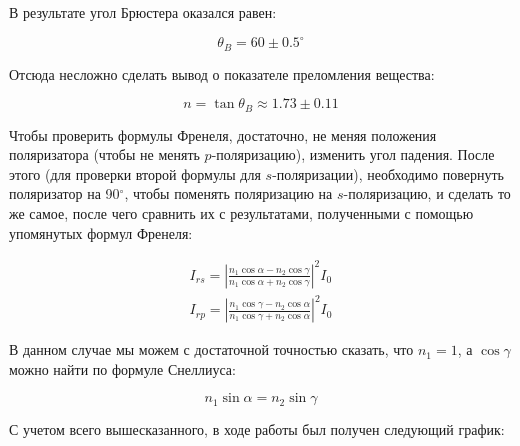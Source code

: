 \documentclass[a4paper, 12pt]{article}
\begin{document}
В результате угол Брюстера оказался равен:

\begin{equation*}
		\theta_{B} = 60 \pm 0.5 ^\circ 
\end{equation*}

Отсюда несложно сделать вывод о показателе преломления вещества:

\begin{equation*}
		n = \tan\theta_B \approx 1.73 \pm 0.11
\end{equation*}

Чтобы проверить формулы Френеля, достаточно, не меняя положения поляризатора (чтобы не менять $p$-поляризацию), изменить угол падения. После этого (для проверки второй формулы для $s$-поляризации), необходимо повернуть поляризатор на 90$^\circ$, чтобы поменять поляризацию на $s$-поляризацию, и сделать то же самое, после чего сравнить их с результатами, полученными с помощью упомянутых формул Френеля:

\begin{align}
	I_{rs} = \left|\frac{n_1\cos\alpha - n_2\cos\gamma}{n_1\cos\alpha + n_2 \cos\gamma}\right|^2 I_0\\
	I_{rp} = \left|\frac{n_1\cos\gamma - n_2\cos\alpha}{n_1\cos\gamma + n_2\cos\alpha}\right|^2 I_0
	\label{eq:fresnel}
\end{align}

В данном случае мы можем с достаточной точностью сказать, что $n_1 = 1$, а $\cos\gamma$ можно найти по формуле Снеллиуса:

\begin{equation}
	n_1\sin\alpha = n_2\sin\gamma
	\label{eq:snel}
\end{equation}

С учетом всего вышесказанного, в ходе работы был получен следующий график:
\end{document}
